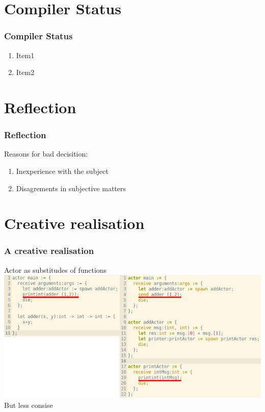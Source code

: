 \section{Compiler Status}
\begin{frame}
	\frametitle{Compiler Status}
	 \begin{enumerate}
    \item Item1
    \item Item2
  \end{enumerate}
\end{frame}

\section{Reflection}
\begin{frame}
	\frametitle{Reflection}
	Reasons for bad decisition:
	\begin{enumerate}
    \item Inexperience with the subject
    \item Disagrements in subjective matters
  \end{enumerate}
\end{frame}

\section{Creative realisation}
\begin{frame}
	\frametitle{A creative realisation}
	Actor as substitudes of functions
	\includegraphics[width=\textwidth]{Images/actorFunc.png}
	But less consise
\end{frame}


